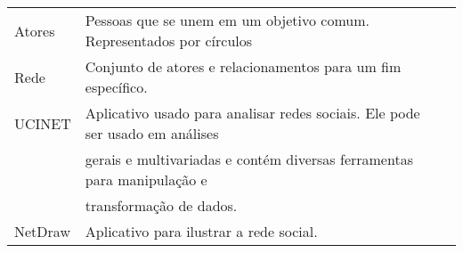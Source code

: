 \label{ap:glossario}

\begin{table}[htbp]
\centering
\caption{}
\label{concepts}
\begin{tabular}{|l|l|l}
\cline{1-2}
Atores  & Pessoas que se unem em um objetivo comum. Representados por círculos                                                                                                         &  \\ \cline{1-2}
Rede    & Conjunto de atores e relacionamentos para um fim específico.                                                                                                                 &  \\ \cline{1-2}
UCINET  & Aplicativo usado para analisar redes sociais. Ele pode ser usado em análises \\
        & gerais e multivariadas e contém diversas ferramentas para manipulação e \\
        & transformação de dados. &  \\ \cline{1-2}
NetDraw & Aplicativo para ilustrar a rede social.                                                                                                                                       &  \\ \cline{1-2}
\end{tabular}
\end{table}
